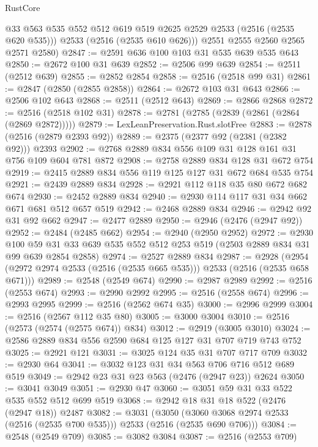 \begin{lexlean}{RustCore}
\begin{coremodule}
          @33
          @563
          @535
          @552
          @512
          @619
          @519
          @2625
          @2529
          @2533
          (@2516 (@2535 @620 @535)))
        @2533
        (@2516 (@2535 @610 @626)))
      @2551
      @2555
      @2560
      @2565
      @2571
      @2580)
@2847 := @2591 @636 @100 @103 @31 @535 @639 @535 @643
@2850 := @2672 @100 @31 @639
@2852 := @2506 @99 @639
@2854 := @2511 (@2512 @639)
@2855 := @2852 @2854
@2858 := @2516 (@2518 @99 @31)
@2861 := @2847 (@2850 (@2855 @2858))
@2864 := @2672 @103 @31 @643
@2866 := @2506 @102 @643
@2868 := @2511 (@2512 @643)
@2869 := @2866 @2868
@2872 := @2516 (@2518 @102 @31)
@2878 := @2781 (@2785 (@2839 (@2861 (@2864 (@2869 @2872)))))
@2879 := LexLeanPreservation.Rust.slotFree
@2883 := @2878 (@2516 (@2879 @2393 @92))
@2889 := @2375 (@2377 @92 (@2381 (@2382 @92))) @2393
@2902 := @2768 @2889 @834 @556 @109 @31 @128 @161 @31 @756 @109 @604 @781 @872
@2908 := @2758 @2889 @834 @128 @31 @672 @754
@2919 := @2415 @2889 @834 @556 @119 @125 @127 @31 @672 @684 @535 @754
@2921 := @2439 @2889 @834
@2928 := @2921 @112 @118 @35 @80 @672 @682 @674
@2930 := @2452 @2889 @834
@2940 := @2930 @114 @117 @31 @34 @662 @671 @681 @512 @657 @519
@2942 := @2468 @2889 @834
@2946 := @2942 @92 @31 @92 @662
@2947 := @2477 @2889
@2950 := @2946 (@2476 (@2947 @92))
@2952 := @2484 (@2485 @662)
@2954 := @2940 (@2950 @2952)
@2972 := @2930
    @100
    @59
    @31
    @33
    @639
    @535
    @552
    @512
    @253
    @519
    (@2503 @2889 @834 @31 @99 @639 @2854 @2858)
@2974 := @2527 @2889 @834
@2987 := @2928 (@2954 (@2972 @2974 @2533 (@2516 (@2535 @665 @535))) @2533 (@2516 (@2535 @658 @671)))
@2989 := @2548 (@2549 @674)
@2990 := @2987 @2989
@2992 := @2516 (@2553 @674)
@2993 := @2990 @2992
@2995 := @2516 (@2558 @674)
@2996 := @2993 @2995
@2999 := @2516 (@2562 @674 @35)
@3000 := @2996 @2999
@3004 := @2516 (@2567 @112 @35 @80)
@3005 := @3000 @3004
@3010 := @2516 (@2573 (@2574 (@2575 @674)) @834)
@3012 := @2919 (@3005 @3010)
@3024 := @2586 @2889 @834 @556 @2590 @684 @125 @127 @31 @707 @719 @743 @752
@3025 := @2921 @121
@3031 := @3025 @124 @35 @31 @707 @717 @709
@3032 := @2930 @64
@3041 := @3032 @123 @31 @34 @563 @706 @716 @512 @689 @519
@3049 := @2942 @23 @31 @23 @563 (@2476 (@2947 @23)) @2624
@3050 := @3041 @3049
@3051 := @2930 @47
@3060 := @3051 @59 @31 @33 @522 @535 @552 @512 @699 @519
@3068 := @2942 @18 @31 @18 @522 (@2476 (@2947 @18)) @2487
@3082 := @3031
    (@3050 (@3060 @3068 @2974 @2533 (@2516 (@2535 @700 @535))) @2533 (@2516 (@2535 @690 @706)))
@3084 := @2548 (@2549 @709)
@3085 := @3082 @3084
@3087 := @2516 (@2553 @709)

\end{coremodule}
\end{lexlean}
